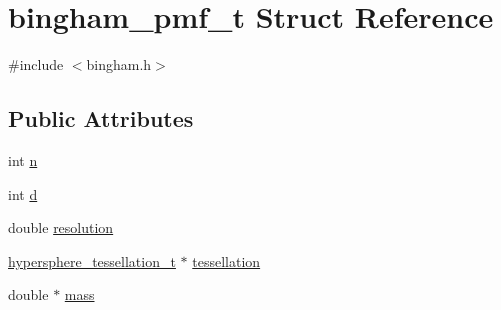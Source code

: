 \hypertarget{structbingham__pmf__t}{
\section{bingham\_\-pmf\_\-t Struct Reference}
\label{structbingham__pmf__t}
}


{\ttfamily \#include $<$bingham.h$>$}

\subsection*{Public Attributes}
\begin{DoxyCompactItemize}
\item 
int \hyperlink{structbingham__pmf__t_af5f44df5873fadd61d52d13cae35995b}{n}
\item 
int \hyperlink{structbingham__pmf__t_abfb8eb53f34efe0ea621950f50b3693f}{d}
\item 
double \hyperlink{structbingham__pmf__t_a28f08b376b3092df65d426d24c69f403}{resolution}
\item 
\hyperlink{structhypersphere__tessellation__t}{hypersphere\_\-tessellation\_\-t} $\ast$ \hyperlink{structbingham__pmf__t_a8365a339f36891609a3595d4d25fbbc1}{tessellation}
\item 
double $\ast$ \hyperlink{structbingham__pmf__t_aa17510093229608bd1501c7301bc3a7b}{mass}
\end{DoxyCompactItemize}


